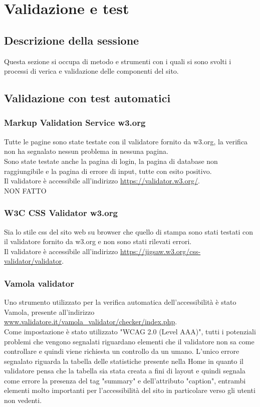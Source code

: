 \documentclass[openany, a4paper, 12pt]{report}
\begin{document}
	\chapter{Validazione e test}
		\section{Descrizione della sessione}
			Questa sezione si occupa di metodo e strumenti con i quali si sono svolti i processi di verica e validazione delle componenti del sito.
		\section{Validazione con test automatici}
			\subsection{Markup Validation Service w3.org}
				Tutte le pagine sono state testate con il validatore fornito da w3.org, la verifica non ha segnalato nessun problema in nessuna pagina.\\
				Sono state testate anche la pagina di login, la pagina di database non raggiungibile e la pagina di errore di input, tutte con esito positivo.\\
				Il validatore è accessibile all'indirizzo \url{https://validator.w3.org/}.\\
				NON FATTO
			\subsection{W3C CSS Validator w3.org}
				Sia lo stile css del sito web su browser che quello di stampa sono stati testati con il validatore fornito da w3.org e non sono stati rilevati errori.\\
Il validatore è accessibile all'indirizzo \url{https://jigsaw.w3.org/css-validator/validator}.\\
			\subsection{Vamola validator}
				Uno strumento utilizzato per la verifica automatica dell'accessibilità è stato Vamola, presente all'indirizzo \url{www.validatore.it/vamola_validator/checker/index.php}.\\
				Come impostazione è stato utilizzato "WCAG 2.0 (Level AAA)", tutti i potenziali problemi che vengono segnalati riguardano elementi che il validatore non sa come controllare e quindi viene richiesta un controllo da un umano.
				L'unico errore segnalato riguarda la tabella delle statistiche presente nella Home in quanto il validatore pensa che la tabella sia stata creata a fini di layout e quindi segnala come errore la presenza del tag "summary" e dell'attributo "caption", entrambi elementi molto importanti per l'accessibilità del sito in particolare verso gli utenti non vedenti.\\
\end{document}
